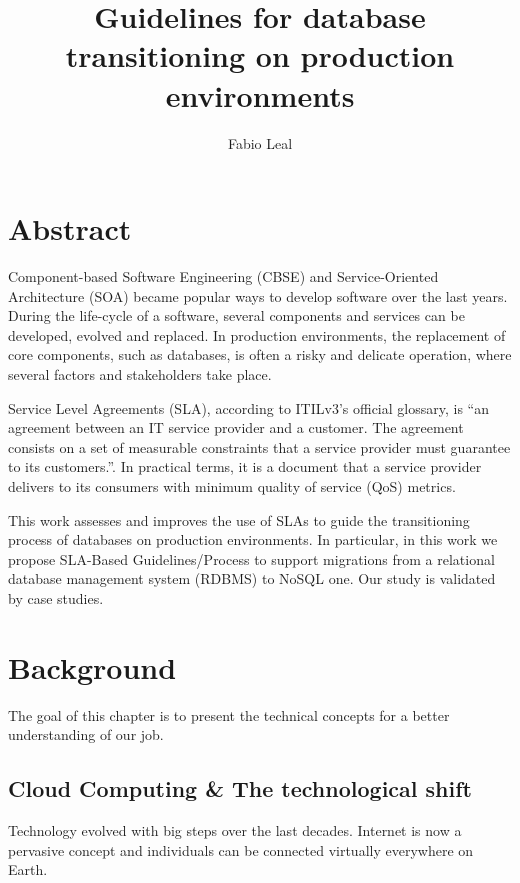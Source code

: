 \documentclass{article}
\begin{document}
\title{Guidelines for database transitioning on production environments}
\author{Fabio Leal}
\maketitle  


\section{Abstract}
Component-based Software Engineering (CBSE) and Service-Oriented Architecture (SOA) became  popular ways to develop software over the last years. During the life-cycle of a software, several components and services can be developed, evolved and replaced. In production environments, the replacement of core components, such as databases, is often a risky and delicate operation, where several factors and stakeholders take place.

Service Level Agreements (SLA), according to ITILv3's official glossary, is ``an agreement between an IT service provider and a customer. The agreement consists on a set of measurable constraints that a service provider must guarantee to its customers.''. In practical terms, it is a document that a service provider delivers to its consumers with minimum quality of service (QoS) metrics.

This work assesses and improves the use of SLAs to guide the transitioning process of databases on production environments. In particular, in this work we propose SLA-Based Guidelines/Process to support migrations from a relational database management system (RDBMS) to NoSQL one. Our study is validated by case studies.





\section{Background}
The goal of this chapter is to present the technical concepts for a better understanding of our job. 

\subsection{Cloud Computing \& The technological shift}

Technology evolved with big steps over the last decades. Internet is now a pervasive concept and individuals can be connected virtually everywhere on Earth. \cite{Armbrust09m.:above}
\end{document}
